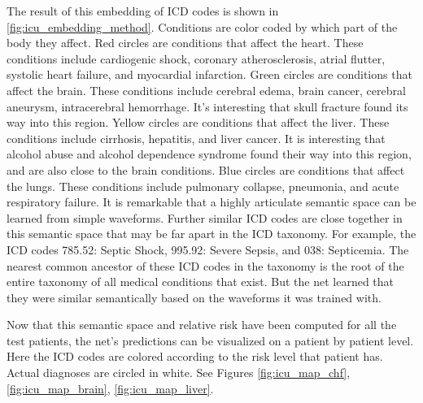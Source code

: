 The result of this embedding of ICD codes is shown in \ref{fig:icu_embedding_method}. Conditions are color coded by which part of the body they affect.  Red circles are conditions that affect the heart.  These conditions include cardiogenic shock, coronary atherosclerosis, atrial flutter, systolic heart failure, and myocardial infarction.  Green circles are conditions that affect the brain.  These conditions include cerebral edema, brain cancer, cerebral aneurysm, intracerebral hemorrhage.  It’s interesting that skull fracture found its way into this region.  Yellow circles are conditions that affect the liver.  These conditions include cirrhosis, hepatitis, and liver cancer.  It is interesting that alcohol abuse and alcohol dependence syndrome found their way into this region, and are also close to the brain conditions.  Blue circles are conditions that affect the lungs.  These conditions include pulmonary collapse, pneumonia, and acute respiratory failure.  It is remarkable that a highly articulate semantic space can be learned from simple waveforms.  Further similar ICD codes are close together in this semantic space that may be far apart in the ICD taxonomy.  For example, the ICD codes 785.52: Septic Shock, 995.92: Severe Sepsis, and 038: Septicemia.  The nearest common ancestor of these ICD codes in the taxonomy is the root of the entire taxonomy of all medical conditions that exist.  But the net learned that they were similar semantically based on the waveforms it was trained with.

Now that this semantic space and relative risk have been computed for all the test patients, the net's predictions can be visualized on a patient by patient level.  Here the ICD codes are colored according to the risk level that patient has.  Actual diagnoses are circled in white.  See Figures \ref{fig:icu_map_chf}, \ref{fig:icu_map_brain}, \ref{fig:icu_map_liver}.

\figIcuEmbeddingMethod
\figIcuIcdMap
\figIcuMaps